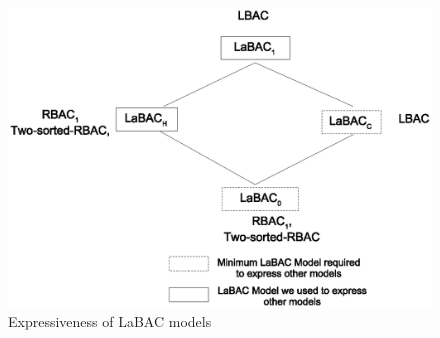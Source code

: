  \begin{figure}
 	\centering
 	\includegraphics[width=.8\textwidth]{ABAC16/expressiveness-spectrum}
 	\caption{Expressiveness of LaBAC models}
 	\label{fig:expressiveness-spectrum}
 \end{figure}